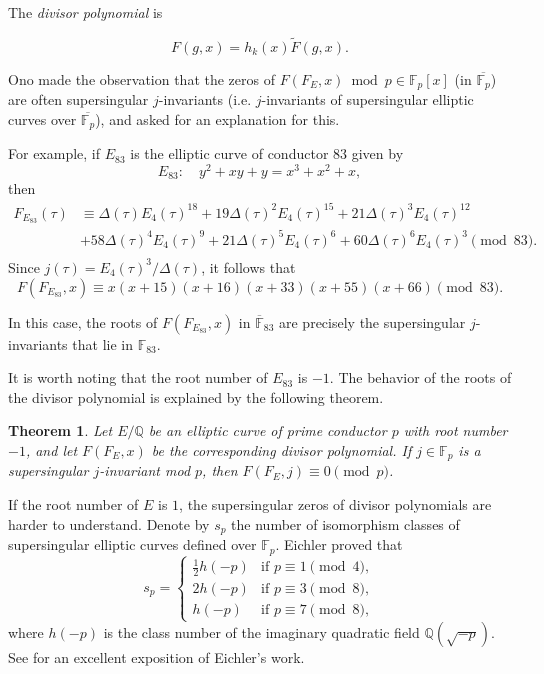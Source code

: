 \documentclass[13pt]{amsart}
\newtheorem{theorem}{Theorem}
\theoremstyle{remark}
\numberwithin{theorem}{section} \numberwithin{equation}{section}
\begin{document}
The \emph{divisor polynomial} is 

\[ F(g,x)= h_{k}(x)\tilde{F}(g,x) .\]

Ono \cite[p.~118]{Ono} made the observation that the zeros of $F(F_E,x) \bmod{p} 
\in {\mathbb{F}_p}[x]$ (in $\overline{\mathbb{F}_p}$) are often supersingular $j$-invariants (i.e. 
$j$-invariants of supersingular elliptic curves over $\overline{\mathbb{F}_p}$), and 
asked for an explanation for this. 

For example, if $E_{83}$ is the elliptic curve of conductor $83$ given by 
\[
E_{83}: \quad y^2+xy+y=x^3+x^2+x,
\]
then 
\begin{align*}
F_{E_{83}}(\tau) &\equiv  \Delta(\tau)E_4(\tau)^{18}+19 \Delta(\tau)^2 E_4(\tau)^{15}+21 \Delta(\tau)^3 E_4(\tau)^{12}\\
&+58 \Delta(\tau)^4 E_4(\tau)^9 + 21 \Delta(\tau)^5 E_4(\tau)^6+60\Delta(\tau)^6 E_4(\tau)^3 \pmod{83}.\\
\end{align*}
Since $j(\tau)=E_4(\tau)^3/\Delta(\tau)$, it follows that
$$F(F_{E_{83}},x)\equiv x(x+15)(x+16)(x+33)(x+55)(x+66) \pmod{83}.$$

In this case, the roots of $F(F_{E_{83}},x)$ in $\overline{\mathbb{F}}_{83}$ are precisely the supersingular $j$-invariants that lie in ${\mathbb{F}}_{83}$.

It is worth noting that the root number of $E_{83}$ is $-1$. The behavior of the roots of the divisor polynomial is explained by the following theorem. 

\begin{theorem}\label{thm:1}
Let $E/{\mathbb{Q}}$ be an elliptic curve of prime conductor $p$ with root number $-1$, 
and let $F(F_E,x)$ be the corresponding divisor polynomial. If $j\in {\mathbb{F}_p}$ is a 
supersingular $j$-invariant mod $p$, then $F(F_E,j)\equiv 0 \pmod{p}$.
\end{theorem}
 
If the root number of $E$ is $1$, the supersingular zeros of divisor polynomials are harder to understand.
Denote by $s_p$ the number of isomorphism classes of supersingular elliptic curves defined over ${\mathbb{F}_p}$. Eichler proved that
\[
s_p=
\begin{cases}
\frac{1}{2}h(-p) &\textrm{if } p \equiv 1 \pmod{4},\\
2h(-p) &\textrm{if }p \equiv 3 \pmod{8},\\
h(-p) &\textrm{if }p \equiv 7 \pmod{8},
\end{cases}
\]
where $h(-p)$ is the class number of the imaginary quadratic field ${\mathbb{Q}}(\sqrt{-p})$. See \cite{Gross} for an excellent exposition of Eichler's work.
\end{document}
